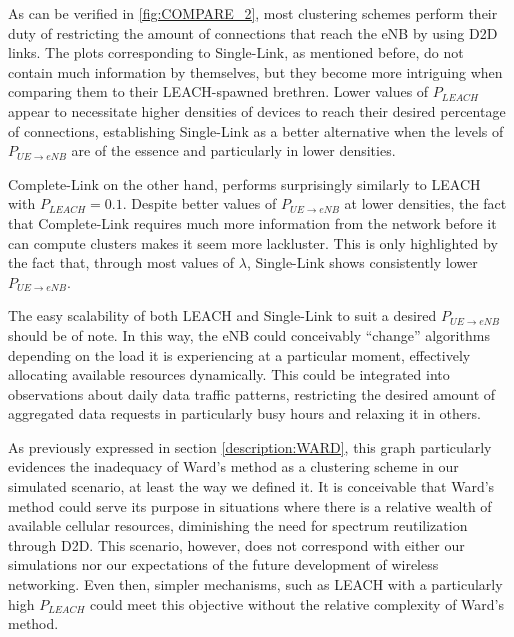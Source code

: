 As can be verified in \ref{fig:COMPARE_2}, most clustering schemes perform their duty of restricting the amount of connections that reach the eNB by using D2D links. The plots corresponding to Single-Link, as mentioned before, do not contain much information by themselves, but they become more intriguing when comparing them to their LEACH-spawned brethren. Lower values of $P_{LEACH}$ appear to necessitate higher densities of devices to reach their desired percentage of connections, establishing Single-Link as a better alternative when the levels of $P_{UE\rightarrow eNB}$ are of the essence and particularly in lower densities.

Complete-Link on the other hand, performs surprisingly similarly to LEACH with $P_{LEACH} = 0.1$. Despite better values of $P_{UE\rightarrow eNB}$ at lower densities, the fact that Complete-Link requires much more information from the network before it can compute clusters makes it seem more lackluster. This is only highlighted by the fact that, through most values of $\lambda$, Single-Link shows consistently lower $P_{UE\rightarrow eNB}$.


The easy scalability of both LEACH and Single-Link to suit a desired $P_{UE\rightarrow eNB}$
should be of note. In this way, the eNB could conceivably ``change'' algorithms depending on the load it is experiencing at a particular moment, effectively allocating available resources dynamically. This could be integrated into observations about daily data traffic patterns, restricting the desired amount of aggregated data requests in particularly busy hours and relaxing it in others.

As previously expressed in section \ref{description:WARD}, this graph particularly evidences the inadequacy of Ward's method as a clustering scheme in our simulated scenario, at least the way we defined it. It is conceivable that Ward's method could serve its purpose in situations where there is a relative wealth of available cellular resources, diminishing the need for spectrum reutilization through D2D. This scenario, however, does not correspond with either our simulations nor our expectations of the future development of wireless networking. Even then, simpler mechanisms, such as LEACH with a particularly high $P_{LEACH}$ could meet this objective without the relative complexity of Ward's method.


